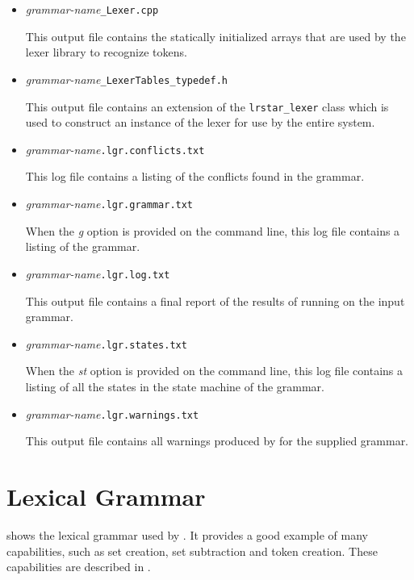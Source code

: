 \begin{itemize}
\item \emph{grammar-name}\texttt{\_Lexer.cpp}

  This output file contains the statically initialized arrays that are
  used by the lexer library to recognize tokens.

\item \emph{grammar-name}\texttt{\_LexerTables\_typedef.h}

  This output file contains an extension of the \texttt{lrstar\_lexer}
  class which is used to construct an instance of the lexer for use by
  the entire system.

\item \emph{grammar-name}\texttt{.lgr.conflicts.txt}

  This log file contains a listing of the conflicts found in the grammar.

\item \emph{grammar-name}\texttt{.lgr.grammar.txt}

  When the \emph{g} option is provided on the command line, this log
  file contains a listing of the grammar.

\item \emph{grammar-name}\texttt{.lgr.log.txt}

  This output file contains a final report of the results of running
  \dfae on the input grammar.

\item \emph{grammar-name}\texttt{.lgr.states.txt}

  When the \emph{st} option is provided on the command line, this log
  file contains a listing of all the states in the state machine of
  the grammar.

\item \emph{grammar-name}\texttt{.lgr.warnings.txt}

  This output file contains all warnings produced by \dfae for the
  supplied grammar.

\end{itemize}

\section{Lexical Grammar}
 shows the lexical grammar used by \dfae.  It
provides a good example of many \dfae capabilities, such as set
creation, set subtraction and token creation.  These capabilities are
described in .

